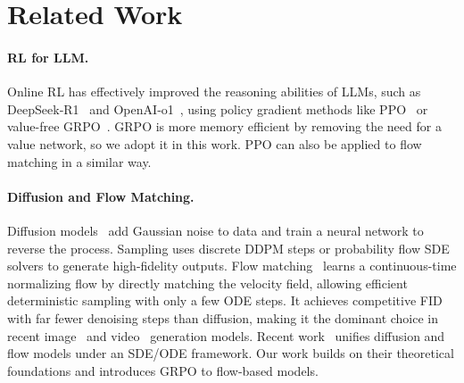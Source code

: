 \section{Related Work}

\paragraph{RL for LLM.} 
Online RL has effectively improved the reasoning abilities of LLMs, such as DeepSeek‑R1~\cite{deepseek_r1} and OpenAI‑o1~\cite{openai_o1}, using policy gradient methods like PPO~\cite{ppo} or value-free GRPO~\cite{grpo}. GRPO is more memory efficient by removing the need for a value network, so we adopt it in this work. PPO can also be applied to flow matching in a similar way.
\vspace{-2mm}
\paragraph{Diffusion and Flow Matching.}
Diffusion models~\cite{ho2020denoising, ddim, song2020score} add Gaussian noise to data and train a neural network to reverse the process. Sampling uses discrete DDPM steps or probability flow SDE solvers to generate high-fidelity outputs.
Flow matching~\cite{lipman2022flow, rectified_flow} learns a continuous-time normalizing flow by directly matching the velocity field, allowing efficient deterministic sampling with only a few ODE steps. It achieves competitive FID with far fewer denoising steps than diffusion, making it the dominant choice in recent image~\cite{sd3, flux2024} and video~\cite{kling, wanx, sora, hunyuanvideo} generation models.
Recent work~\cite{albergo2023stochastic, domingo2024adjoint} unifies diffusion and flow models under an SDE/ODE framework. Our work builds on their theoretical foundations and introduces GRPO to flow-based models.
\vspace{-2mm}
